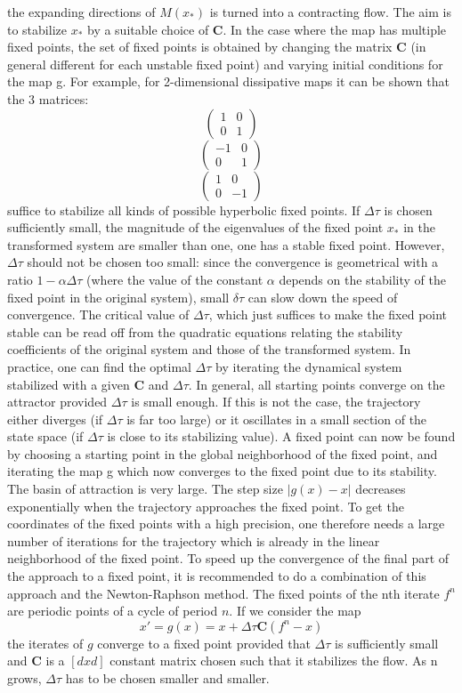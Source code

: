 \begin{description}
the expanding directions of $M(x_*)$ is turned into a contracting flow.
The aim is to stabilize $x_*$ by a suitable choice of $\textbf{C}$. In
the case where the map has multiple fixed points, the set of fixed points
is obtained by changing the matrix $\textbf{C}$ (in general different for
each unstable fixed point) and varying initial conditions for the map g.
For example, for 2-dimensional dissipative maps it can be shown that the
3 matrices:
$$\left(\begin{array}{cc}
1 & 0\\
0 & 1
\end{array}\right)$$
$$\left(\begin{array}{cc}
-1 & 0\\
0 & 1
\end{array}\right)$$
$$\left(\begin{array}{cc}
1 & 0\\
0 & -1
\end{array}\right)$$
suffice to stabilize all kinds of possible hyperbolic fixed points. If
$\Delta\tau$ is chosen sufficiently small, the magnitude of the
eigenvalues of the fixed point $x_*$ in the transformed system are
smaller than one, one has a stable fixed point. However, $\Delta\tau$
should not be chosen too small: since the convergence is geometrical with
a ratio $1-\alpha\Delta\tau$ (where the value of the constant $\alpha$
depends on the stability of the fixed point in the original system),
small $\delta\tau$ can slow down the speed of convergence. The critical
value of $\Delta\tau$, which just suffices to make the fixed point stable
can be read off from the quadratic equations relating the stability
coefficients of the original system and those of the transformed system.
In practice, one can find the optimal $\Delta\tau$ by iterating the
dynamical system stabilized with a given $\textbf{C}$ and $\Delta\tau$.
In general, all starting points converge on the attractor provided
$\Delta\tau$ is small enough. If this is not the case, the trajectory
either diverges (if $\Delta\tau$ is far too large) or it oscillates in a
small section of the state space (if $\Delta\tau$ is close to its
stabilizing value). A fixed point can now be found by choosing a starting
point in the global neighborhood of the fixed point, and iterating the
map g which now converges to the fixed point due to its stability. The
basin of attraction is very large. The step size $|g(x)-x|$ decreases
exponentially when the trajectory approaches the fixed point. To get the
coordinates of the fixed points with a high precision, one therefore
needs a large number of iterations for the trajectory which is already in
the linear neighborhood of the fixed point. To speed up the convergence
of the final part of the approach to a fixed point, it is recommended to
do a combination of this approach and the Newton-Raphson method. The
fixed points of the nth iterate $f^n$ are periodic points of a cycle of
period $n$. If we consider the map
$$x'=g(x)=x+\Delta\tau\textbf{C}(f^n-x)$$
the iterates of $g$ converge to a fixed point provided that $\Delta\tau$
is sufficiently small and $\textbf{C}$ is a $[dxd]$ constant matrix
chosen such that it stabilizes the flow. As n grows, $\Delta\tau$ has to
be chosen smaller and smaller.


\end{description}
